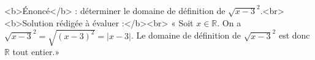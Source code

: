 <b>Énoncé</b> : déterminer le domaine de définition de $\sqrt{x-3}^2$.<br> <b>Solution rédigée à évaluer :</b><br>  « Soit $x\in\mathbb{R}$. On a $\sqrt{x-3}^2 = \sqrt{(x-3)^2} = |x-3|$. Le domaine de définition de $\sqrt{x-3}^2$ est donc $\mathbb{R}$ tout entier.»

\begin{reponses}
\end{reponses}

\begin{comment}
Erreur dès le début.
\end{comment}

